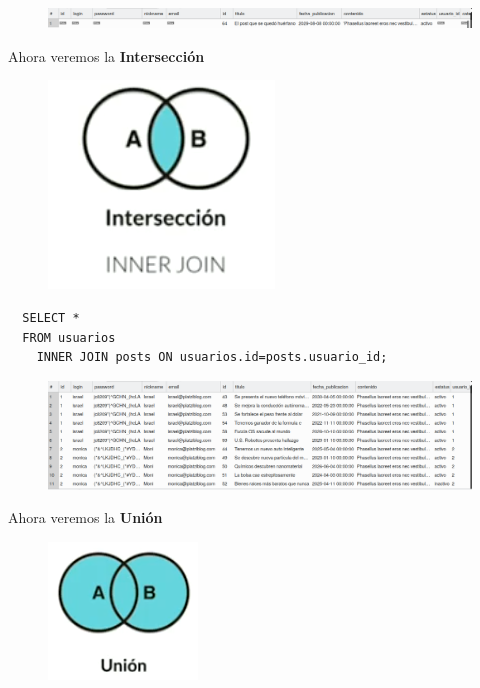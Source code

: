 \documentclass{article}
\begin{document}
\newpage

\begin{figure}[h!]
  \centering
  \includegraphics[scale=0.5]{./Pictures/095_join_right_not_null.png}
\end{figure}


Ahora veremos la \textbf{Intersección}\\
\begin{figure}[h!]
  \centering
  \includegraphics[scale=0.75]{./Pictures/096_Interseccion.png}
\end{figure}

\begin{verbatim}
  SELECT *
  FROM usuarios
    INNER JOIN posts ON usuarios.id=posts.usuario_id;
\end{verbatim}

\begin{figure}[h!]
  \centering
  \includegraphics[scale=0.5]{./Pictures/099_inner.png}
\end{figure}


Ahora veremos la \textbf{Unión}\\

\begin{figure}[h!]
  \centering
  \includegraphics[scale=0.75]{./Pictures/097_union.png}
\end{figure}
\end{document}
